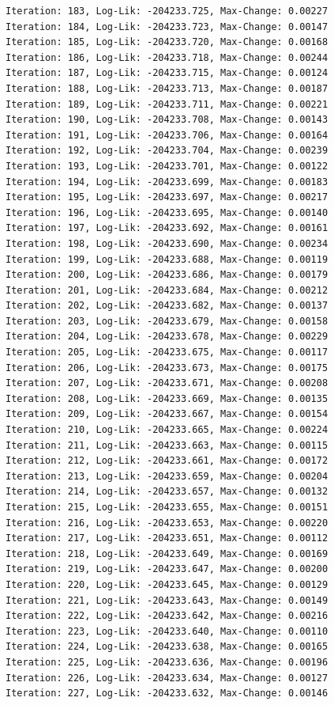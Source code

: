 \documentclass[
  letterpaper,
  DIV=11,
  numbers=noendperiod]{scrreport}
\begin{document}
\begin{verbatim}
Iteration: 183, Log-Lik: -204233.725, Max-Change: 0.00227
Iteration: 184, Log-Lik: -204233.723, Max-Change: 0.00147
Iteration: 185, Log-Lik: -204233.720, Max-Change: 0.00168
Iteration: 186, Log-Lik: -204233.718, Max-Change: 0.00244
Iteration: 187, Log-Lik: -204233.715, Max-Change: 0.00124
Iteration: 188, Log-Lik: -204233.713, Max-Change: 0.00187
Iteration: 189, Log-Lik: -204233.711, Max-Change: 0.00221
Iteration: 190, Log-Lik: -204233.708, Max-Change: 0.00143
Iteration: 191, Log-Lik: -204233.706, Max-Change: 0.00164
Iteration: 192, Log-Lik: -204233.704, Max-Change: 0.00239
Iteration: 193, Log-Lik: -204233.701, Max-Change: 0.00122
Iteration: 194, Log-Lik: -204233.699, Max-Change: 0.00183
Iteration: 195, Log-Lik: -204233.697, Max-Change: 0.00217
Iteration: 196, Log-Lik: -204233.695, Max-Change: 0.00140
Iteration: 197, Log-Lik: -204233.692, Max-Change: 0.00161
Iteration: 198, Log-Lik: -204233.690, Max-Change: 0.00234
Iteration: 199, Log-Lik: -204233.688, Max-Change: 0.00119
Iteration: 200, Log-Lik: -204233.686, Max-Change: 0.00179
Iteration: 201, Log-Lik: -204233.684, Max-Change: 0.00212
Iteration: 202, Log-Lik: -204233.682, Max-Change: 0.00137
Iteration: 203, Log-Lik: -204233.679, Max-Change: 0.00158
Iteration: 204, Log-Lik: -204233.678, Max-Change: 0.00229
Iteration: 205, Log-Lik: -204233.675, Max-Change: 0.00117
Iteration: 206, Log-Lik: -204233.673, Max-Change: 0.00175
Iteration: 207, Log-Lik: -204233.671, Max-Change: 0.00208
Iteration: 208, Log-Lik: -204233.669, Max-Change: 0.00135
Iteration: 209, Log-Lik: -204233.667, Max-Change: 0.00154
Iteration: 210, Log-Lik: -204233.665, Max-Change: 0.00224
Iteration: 211, Log-Lik: -204233.663, Max-Change: 0.00115
Iteration: 212, Log-Lik: -204233.661, Max-Change: 0.00172
Iteration: 213, Log-Lik: -204233.659, Max-Change: 0.00204
Iteration: 214, Log-Lik: -204233.657, Max-Change: 0.00132
Iteration: 215, Log-Lik: -204233.655, Max-Change: 0.00151
Iteration: 216, Log-Lik: -204233.653, Max-Change: 0.00220
Iteration: 217, Log-Lik: -204233.651, Max-Change: 0.00112
Iteration: 218, Log-Lik: -204233.649, Max-Change: 0.00169
Iteration: 219, Log-Lik: -204233.647, Max-Change: 0.00200
Iteration: 220, Log-Lik: -204233.645, Max-Change: 0.00129
Iteration: 221, Log-Lik: -204233.643, Max-Change: 0.00149
Iteration: 222, Log-Lik: -204233.642, Max-Change: 0.00216
Iteration: 223, Log-Lik: -204233.640, Max-Change: 0.00110
Iteration: 224, Log-Lik: -204233.638, Max-Change: 0.00165
Iteration: 225, Log-Lik: -204233.636, Max-Change: 0.00196
Iteration: 226, Log-Lik: -204233.634, Max-Change: 0.00127
Iteration: 227, Log-Lik: -204233.632, Max-Change: 0.00146

\end{verbatim}
\end{document}

